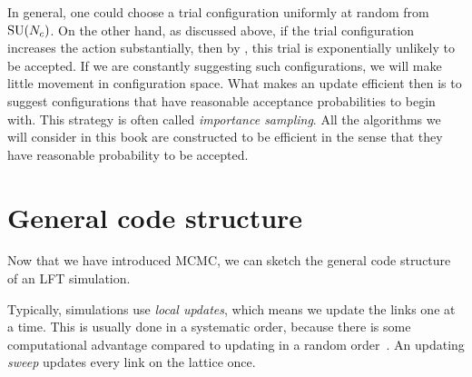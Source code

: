 In general, one could choose a trial configuration uniformly at random
from $\operatorname{SU}(N_c)$. On the other hand, as discussed above, if the trial
configuration increases the action substantially, then by
, this trial is exponentially unlikely to
be accepted. If we are constantly suggesting such configurations,
we will make little movement in configuration space.
What makes an update efficient then is to suggest configurations that
have reasonable acceptance probabilities to begin with. This
strategy is often called {\it importance sampling}.
All the algorithms we will consider in this book are constructed to be
efficient in the sense that they have reasonable probability to be accepted.


\section{General code structure}\label{sec:generalCodeStructure}

Now that we have introduced MCMC, we can sketch the
general code structure of an LFT simulation. 

Typically, simulations use {\it local updates}, which
means we update the links one at a time. This is usually done in a systematic order,
because there is some computational advantage compared to updating in a
random order~\cite{berg_markov_2004}. 
An updating {\it sweep} updates every link on the lattice once. 

